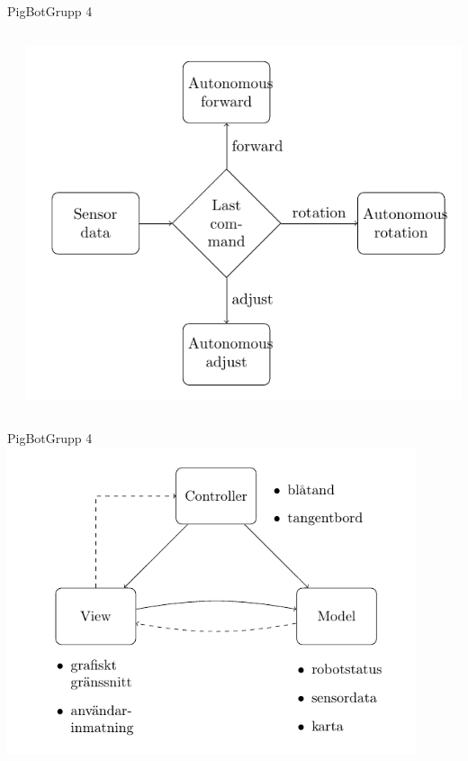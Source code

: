 \begin{frame}{PigBot}{Grupp 4}
\begin{columns}
\begin{column}{0.5\textwidth}
		\end{column}
		\pause
    		\begin{column}{0.5\textwidth}
      			\includegraphics[width=\textwidth]{images/controllerSensorFlow.pdf}
    		\end{column}
  	\end{columns}
\end{frame}

\begin{frame}{PigBot}{Grupp 4}
\centering
	\includegraphics[width=0.9\textwidth]{images/modelViewController.pdf}
\end{frame}

